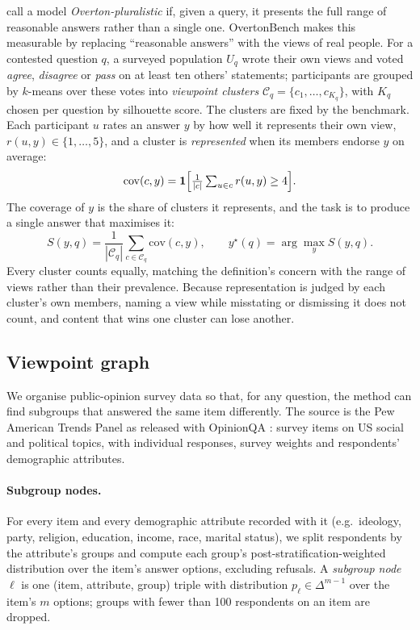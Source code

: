 \documentclass[11pt]{article}
\begin{document}
\citet{sorensen2024roadmap} call a model \emph{Overton-pluralistic} if, given a
query, it presents the full range of reasonable answers rather than a single
one. OvertonBench \citep{placeholder-overtonbench} makes this measurable by
replacing ``reasonable answers'' with the views of real people. For a contested
question $q$, a surveyed population $U_q$ wrote their own views and voted
\emph{agree}, \emph{disagree} or \emph{pass} on at least ten others'
statements; participants are grouped by $k$-means over these votes into
\emph{viewpoint clusters} $\mathcal{C}_q = \{c_1, \dots, c_{K_q}\}$, with $K_q$
chosen per question by silhouette score. The clusters are fixed by the
benchmark. Each participant $u$ rates an answer $y$ by how well it represents
their own view, $r(u, y) \in \{1, \dots, 5\}$, and a cluster is
\emph{represented} when its members endorse $y$ on average:
\begin{equation}
  \mathrm{cov}(c, y) = \mathbf{1}\Bigl[\tfrac{1}{|c|}\textstyle\sum_{u \in c} r(u, y) \ge 4\Bigr].
  \label{eq:cov}
\end{equation}
The coverage of $y$ is the share of clusters it represents, and the task is to
produce a single answer that maximises it:
\begin{equation}
  S(y, q) = \frac{1}{|\mathcal{C}_q|}\sum_{c \in \mathcal{C}_q} \mathrm{cov}(c, y),
  \qquad
  y^\star(q) = \arg\max_{y} S(y, q).
\end{equation}
Every cluster counts equally, matching the definition's concern with the range
of views rather than their prevalence. Because representation is judged by each
cluster's own members, naming a view while misstating or dismissing it does
not count, and content that wins one cluster can lose another.

\subsection{Viewpoint graph}
\label{sec:graph}

We organise public-opinion survey data so that, for any question, the method
can find subgroups that answered the same item differently. The source is the
Pew American Trends Panel as released with OpinionQA \citep{santurkar2023whose}:
survey items on US social and political topics, with individual responses,
survey weights and respondents' demographic attributes.

\paragraph{Subgroup nodes.}
For every item and every demographic attribute recorded with it (e.g.\
ideology, party, religion, education, income, race, marital status), we split
respondents by the attribute's groups and compute each group's
post-stratification-weighted distribution over the item's answer options,
excluding refusals. A \emph{subgroup node} $\ell$ is one (item, attribute,
group) triple with distribution $p_\ell \in \Delta^{m-1}$ over the item's $m$
options; groups with fewer than 100 respondents on an item are dropped.
\end{document}
